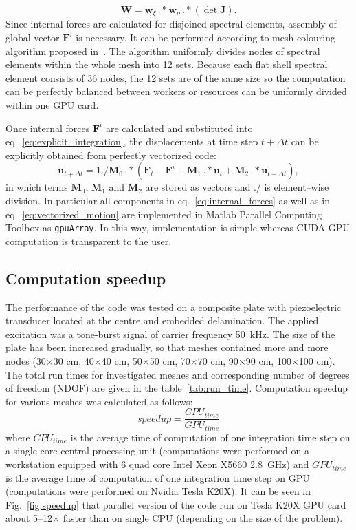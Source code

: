 \documentclass[preprint,12pt]{elsarticle}
\renewcommand{\vec}[1]{\mathbf{#1}}
\begin{document}
	\begin{equation}
	\vec{W} = \vec{w}_{\xi}\,.*\vec{w}_{\eta}\,.*\left(\det\vec{J}\right).
	\end{equation}
	Since internal forces are calculated for disjoined spectral elements, assembly of global vector $\vec{F}^i$ is necessary. It can be performed according to mesh colouring algorithm proposed in~\cite{Kudela2016}. The algorithm uniformly divides nodes of spectral elements within the whole mesh into 12 sets. Because each flat shell spectral element consists of 36 nodes, the 12 sets are of the same size so the computation can be perfectly balanced between workers or resources can be uniformly divided within one GPU card.
	
	Once internal forces $\vec{F}^i$ are calculated and substituted into eq.~\ref{eq:explicit_integration}, the displacements at time step $t+\Delta t$ can be explicitly obtained from perfectly vectorized code:
	\begin{equation}
	\vec{u}_{t+\Delta t}=1./\vec{M}_0\, .*\left(\vec{F}_t - \vec{F}^i +\vec{M}_1 \, .* \vec{u}_t +\vec{M}_2 \, .* \vec{u}_{t-\Delta t}\right),
	\label{eq:vectorized_motion}
	\end{equation} 
	in which terms $\vec{M}_0$, $\vec{M}_1$ and $\vec{M}_2$ are stored as vectors and $./$ is element--wise division. In particular all components in eq.~\ref{eq:internal_forces} as well as in eq.~\ref{eq:vectorized_motion} are implemented in Matlab Parallel Computing Toolbox as \verb|gpuArray|. In this way, implementation is simple whereas CUDA GPU computation is transparent to the user. 
	\subsection{Computation speedup}
	The performance of the code was tested on a composite plate with piezoelectric transducer located at the centre and embedded delamination. The applied excitation was a tone-burst signal of carrier frequency 50~kHz. The size of the plate
	has been increased gradually, so that meshes contained more and more nodes (30$\times$30 cm, 40$\times$40 cm, 50$\times$50 cm, 70$\times$70 cm, 90$\times$90 cm, 100$\times$100 cm). The total run times for investigated meshes and corresponding number of degrees of freedom (NDOF) are given in the table~\ref{tab:run_time}. Computation speedup for various meshes was calculated as follows:
	\begin{equation}
	speedup = \frac{CPU_{time}}{GPU_{time}}
	\label{eq:speedup}
	\end{equation}
	where $CPU_{time}$ is the average time of computation of one integration time step on a single core central
	processing unit (computations were performed on a workstation equipped with 6 quad core Intel
	Xeon X5660 2.8~GHz) and $GPU_{time}$ is the average time of computation of one integration time step on
	GPU (computations were performed on Nvidia Tesla K20X). It can be seen in Fig.~\ref{fig:speedup} that parallel version of the code run on Tesla K20X GPU card about 5--12$\times$ faster than on single CPU (depending on the size of the problem). 
	
\end{document}
